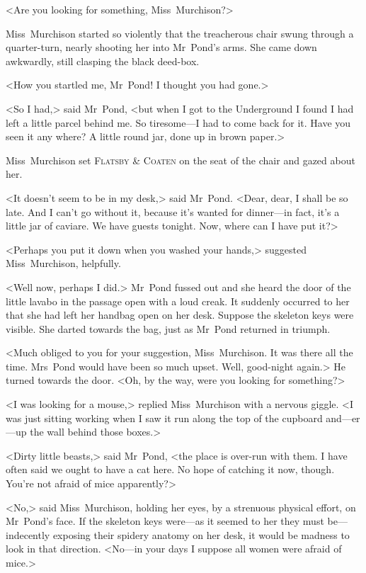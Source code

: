 <Are you looking for something, Miss~Murchison?>

Miss~Murchison started so violently that the treacherous chair swung through a quarter-turn, nearly shooting her into Mr~Pond's arms. She came down awkwardly, still clasping the black deed-box.

<How you startled me, Mr~Pond! I thought you had gone.>

<So I had,> said Mr~Pond, <but when I got to the Underground I found I had left a little parcel behind me. So tiresome—I had to come back for it. Have you seen it any where? A little round jar, done up in brown paper.>

Miss~Murchison set \textsc{Flatsby \& Coaten} on the seat of the chair and gazed about her.

<It doesn't seem to be in my desk,> said Mr~Pond. <Dear, dear, I shall be so late. And I can't go without it, because it's wanted for dinner—in fact, it's a little jar of caviare. We have guests tonight. Now, where can I have put it?>

<Perhaps you put it down when you washed your hands,> suggested Miss~Murchison, helpfully.

<Well now, perhaps I did.> Mr~Pond fussed out and she heard the door of the little lavabo in the passage open with a loud creak. It suddenly occurred to her that she had left her handbag open on her desk. Suppose the skeleton keys were visible. She darted towards the bag, just as Mr~Pond returned in triumph.

<Much obliged to you for your suggestion, Miss~Murchison. It was there all the time. Mrs~Pond would have been so much upset. Well, good-night again.> He turned towards the door. <Oh, by the way, were you looking for something?>

<I was looking for a mouse,> replied Miss~Murchison with a nervous giggle. <I was just sitting working when I saw it run along the top of the cupboard and—er—up the wall behind those boxes.>

<Dirty little beasts,> said Mr~Pond, <the place is over-run with them. I have often said we ought to have a cat here. No hope of catching it now, though. You're not afraid of mice apparently?>

<No,> said Miss~Murchison, holding her eyes, by a strenuous physical effort, on Mr~Pond's face. If the skeleton keys were—as it seemed to her they must be—indecently exposing their spidery anatomy on her desk, it would be madness to look in that direction. <No—in your days I suppose all women were afraid of mice.>

